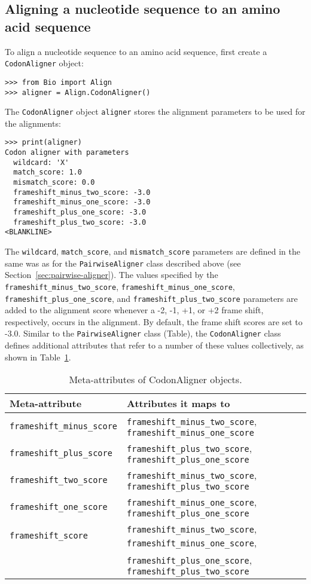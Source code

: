 \subsection{Aligning a nucleotide sequence to an amino acid sequence}
To align a nucleotide sequence to an amino acid sequence, first create a \verb+CodonAligner+ object:
\begin{verbatim}
>>> from Bio import Align
>>> aligner = Align.CodonAligner()
\end{verbatim}
The \verb+CodonAligner+ object \verb+aligner+ stores the alignment parameters to be used for the alignments:
\begin{verbatim}
>>> print(aligner)
Codon aligner with parameters
  wildcard: 'X'
  match_score: 1.0
  mismatch_score: 0.0
  frameshift_minus_two_score: -3.0
  frameshift_minus_one_score: -3.0
  frameshift_plus_one_score: -3.0
  frameshift_plus_two_score: -3.0
<BLANKLINE>
\end{verbatim}
The \verb+wildcard+, \verb+match_score+, and \verb+mismatch_score+ parameters are defined in the same was as for the \verb+PairwiseAligner+ class described above (see Section~\ref{sec:pairwise-aligner}). The values specified by the \verb+frameshift_minus_two_score+, \verb+frameshift_minus_one_score+, \verb+frameshift_plus_one_score+, and \verb+frameshift_plus_two_score+ parameters are added to the alignment score whenever a -2, -1, +1, or +2 frame shift, respectively, occurs in the alignment. By default, the frame shift scores are set to -3.0.
Similar to the \verb+PairwiseAligner+ class (Table\label{table:align-meta-attributes}), the \verb+CodonAligner+ class defines additional attributes that refer to a number of these values collectively, as shown in Table~\ref{table:codonalign-meta-attributes}.
\begin{table}
\caption{Meta-attributes of CodonAligner objects.}
\begin{tabular}{|l|l|}
\hline
\textbf{Meta-attribute} & \textbf{Attributes it maps to} \\
\hline
\verb+frameshift_minus_score+ & \verb+frameshift_minus_two_score+, \verb+frameshift_minus_one_score+ \\
\verb+frameshift_plus_score+ & \verb+frameshift_plus_two_score+, \verb+frameshift_plus_one_score+ \\
\verb+frameshift_two_score+ & \verb+frameshift_minus_two_score+, \verb+frameshift_plus_two_score+ \\
\verb+frameshift_one_score+ & \verb+frameshift_minus_one_score+, \verb+frameshift_plus_one_score+ \\
\verb+frameshift_score+ & \verb+frameshift_minus_two_score+, \verb+frameshift_minus_one_score+, \\
 & \verb+frameshift_plus_one_score+, \verb+frameshift_plus_two_score+ \\
\hline
\end{tabular}
\label{table:codonalign-meta-attributes}
\end{table}
